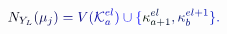 \documentclass[12pt]{article}
\begin{document}
\makeatletter
\renewcommand*{\@textcolor}[3]{%
  \protect\leavevmode
  \begingroup
    \color#1{#2}#3%
  \endgroup
}
\makeatother
\begin{displaymath}
\mathcolor[RGB]{0,0,15}{N} _ { \mathcolor[RGB]{0,0,30}{Y} _ { \mathcolor[RGB]{0,0,45}{L} } } \mathcolor[RGB]{0,0,60}{(} \mathcolor[RGB]{0,0,75}{\mu} _ { \mathcolor[RGB]{0,0,90}{j} } \mathcolor[RGB]{0,0,105}{)} \mathcolor[RGB]{0,0,120}{=} \mathcolor[RGB]{0,0,135}{V} \mathcolor[RGB]{0,0,150}{(} \mathcal { \mathcolor[RGB]{0,0,165}{K} } _ { \mathcolor[RGB]{0,0,180}{a} } ^ { \mathcolor[RGB]{0,0,195}{e} \mathcolor[RGB]{0,0,210}{l} } \mathcolor[RGB]{0,0,225}{)} \mathcolor[RGB]{0,0,240}{\cup} \mathcolor[RGB]{0,0,255}{\{} \mathcolor[RGB]{0,15,0}{\kappa} _ { \mathcolor[RGB]{0,15,15}{a} \mathcolor[RGB]{0,15,30}{+} \mathcolor[RGB]{0,15,45}{1} } ^ { \mathcolor[RGB]{0,15,60}{e} \mathcolor[RGB]{0,15,75}{l} } \mathcolor[RGB]{0,15,90}{,} \mathcolor[RGB]{0,15,105}{\kappa} _ { \mathcolor[RGB]{0,15,120}{b} } ^ { \mathcolor[RGB]{0,15,135}{e} \mathcolor[RGB]{0,15,150}{l} \mathcolor[RGB]{0,15,165}{+} \mathcolor[RGB]{0,15,180}{1} } \mathcolor[RGB]{0,15,195}{\}} \mathcolor[RGB]{0,15,210}{.}
\end{displaymath}
\end{document}
